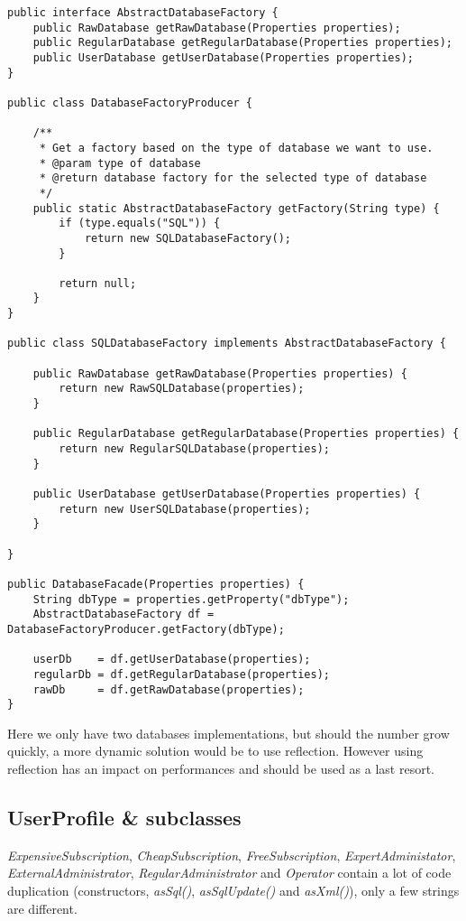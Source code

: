 \begin{lstlisting}
public interface AbstractDatabaseFactory {
	public RawDatabase getRawDatabase(Properties properties);
	public RegularDatabase getRegularDatabase(Properties properties);
	public UserDatabase getUserDatabase(Properties properties);
}

public class DatabaseFactoryProducer {
	
	/**
	 * Get a factory based on the type of database we want to use.
	 * @param type of database
	 * @return database factory for the selected type of database
	 */
	public static AbstractDatabaseFactory getFactory(String type) {
		if (type.equals("SQL")) {
			return new SQLDatabaseFactory();
		}
		
		return null;
	}
}

public class SQLDatabaseFactory implements AbstractDatabaseFactory {

	public RawDatabase getRawDatabase(Properties properties) {
		return new RawSQLDatabase(properties);
	}

	public RegularDatabase getRegularDatabase(Properties properties) {
		return new RegularSQLDatabase(properties);
	}

	public UserDatabase getUserDatabase(Properties properties) {
		return new UserSQLDatabase(properties);
	}

}

public DatabaseFacade(Properties properties) {
	String dbType = properties.getProperty("dbType");
	AbstractDatabaseFactory df = DatabaseFactoryProducer.getFactory(dbType);
	
	userDb    = df.getUserDatabase(properties);
	regularDb = df.getRegularDatabase(properties);
	rawDb     = df.getRawDatabase(properties);
}
\end{lstlisting}

Here we only have two databases implementations, but should the number grow
quickly, a more dynamic solution would be to use reflection. However using
reflection has an impact on performances and should be used as a last resort.


\newpage

\subsection{UserProfile \& subclasses}

\emph{ExpensiveSubscription}, \emph{CheapSubscription},
\emph{FreeSubscription}, \emph{ExpertAdministator},
\emph{ExternalAdministrator}, \emph{RegularAdministrator} and
\emph{Operator} contain a lot of code duplication (constructors,
\emph{asSql()}, \emph{asSqlUpdate()} and \emph{asXml()}), only a few strings
are different.

